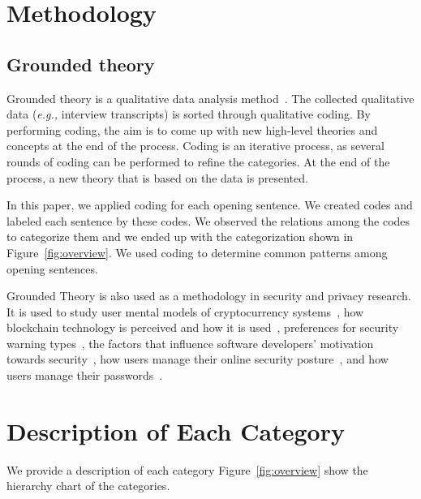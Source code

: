 \documentclass[sigconf]{acmart}
\newcommand{\eg}{\textit{e.g.,}\xspace}
\begin{document}
	
	\section{Methodology}
	\subsection{Grounded theory}
	
	Grounded theory is a qualitative data analysis method~\cite{glaser1968discovery}. The collected qualitative data  (\eg interview transcripts) is sorted through qualitative coding. By performing coding, the aim is to come up with new high-level theories and concepts at the end of the process. Coding is an iterative process, as several rounds of coding can be performed to refine the categories. At the end of the process,  a new theory that is based on the data is presented.
	
	In this paper, we applied coding for each opening sentence. We created codes and labeled each sentence by these codes. We observed the relations among the codes to categorize them and we ended up with the categorization shown in Figure~\ref{fig:overview}.  We used coding to determine common patterns among opening sentences. 
	
	
	
	Grounded Theory is also used as a methodology in security and privacy research. It is used to study user mental models of cryptocurrency systems~\cite{mai2020user}, how blockchain technology is perceived and how it is used~\cite{ruoti2019blockchain}, preferences for security warning types~\cite{danilova2020one}, the factors that influence software developers' motivation towards security~\cite{assal2018motivations},  how users manage their online security posture~\cite{ruoti2017weighing}, and how users manage their passwords~\cite{stobert2014password}.
	
	
	
	
	
	\section{Description of Each Category}
	We provide a description of each category Figure~\ref{fig:overview} show the hierarchy chart of the categories.
	
\end{document}
